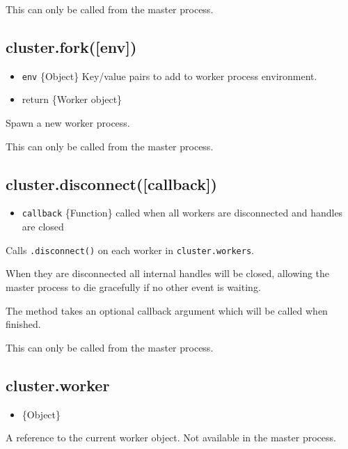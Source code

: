 This can only be called from the master process.

\subsection{cluster.fork({[}env{]})}\label{cluster.forkenv}

\begin{itemize}
\itemsep1pt\parskip0pt
\item
  \texttt{env} \{Object\} Key/value pairs to add to worker process
  environment.
\item
  return \{Worker object\}
\end{itemize}

Spawn a new worker process.

This can only be called from the master process.

\subsection{cluster.disconnect({[}callback{]})}\label{cluster.disconnectcallback}

\begin{itemize}
\itemsep1pt\parskip0pt
\item
  \texttt{callback} \{Function\} called when all workers are
  disconnected and handles are closed
\end{itemize}

Calls \texttt{.disconnect()} on each worker in \texttt{cluster.workers}.

When they are disconnected all internal handles will be closed, allowing
the master process to die gracefully if no other event is waiting.

The method takes an optional callback argument which will be called when
finished.

This can only be called from the master process.

\subsection{cluster.worker}\label{cluster.worker}

\begin{itemize}
\itemsep1pt\parskip0pt
\item
  \{Object\}
\end{itemize}

A reference to the current worker object. Not available in the master
process.

